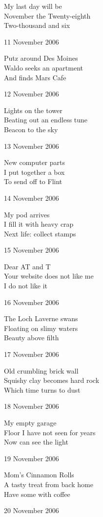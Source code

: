 \documentclass[12pt]{article}
\begin{document}
My last day will be \\
November the Twenty-eighth \\
Two-thousand and six

11 November 2006

Putz around Des Moines \\
Waldo seeks an apartment \\
And finds Mars Cafe

12 November 2006

Lights on the tower \\
Beating out an endless tune \\
Beacon to the sky


\newpage

13 November 2006

New computer parts \\
I put together a box \\
To send off to Flint

14 November 2006

My pod arrives \\
I fill it with heavy crap \\
Next life: collect stamps

15 November 2006

Dear AT and T \\
Your website does not like me \\
I do not like it

16 November 2006

The Loch Laverne swans \\
Floating on slimy waters \\
Beauty above filth

17 November 2006

Old crumbling brick wall \\
Squishy clay becomes hard rock \\
Which time turns to dust

18 November 2006

My empty garage \\
Floor I have not seen for years \\
Now can see the light


\newpage

19 November 2006

Mom's Cinnamon Rolls \\
A tasty treat from back home \\
Have some with coffee

20 November 2006
\end{document}
